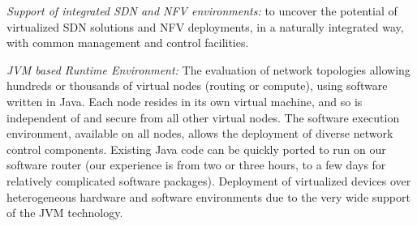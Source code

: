 \begin{description}[leftmargin=1.5em,labelindent=0,itemsep=3pt]
\item \textit{Support of integrated SDN and NFV environments:}
to uncover the potential of
virtualized SDN solutions and NFV deployments, in a naturally
integrated way, with common management and control
facilities.

\item \textit{JVM based Runtime Environment:} The evaluation of
 network topologies allowing hundreds or thousands of virtual
 nodes (routing or compute), using
 software written in Java. Each node resides in its own virtual
 machine, and so is independent of and secure from all other virtual nodes.
 The software execution environment, available on all nodes, allows the deployment of diverse network control components. Existing Java code can be quickly ported to run on our
 software router (our experience is from two or three hours, to a few days for relatively
 complicated software packages). Deployment of virtualized devices over heterogeneous hardware and software environments due to the very wide support of the JVM technology. 


\end{description}

